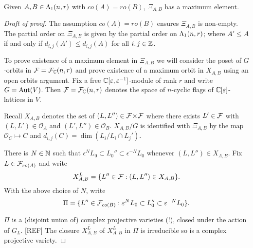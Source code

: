 \documentclass[a4paper, 11pt]{report}
\begin{document}
\begin{proposition}\label{proposition:existence-maximum}
Given $A,B\in\Lambda_1(n,r)$ with $co(A)=ro(B)$, $\Xi_{A,B}$ has a maximum element.
\end{proposition}

\begin{proof}[Draft of proof]
The assumption $co(A)=ro(B)$ ensures $\Xi_{A,B}$ is non-empty. The partial order on $\Xi_{A,B}$ is given by the partial order on $\Lambda_1(n,r)$; where $A'\le A$ if and only if $d_{i,j}(A')\le d_{i,j}(A)$ for all $i,j\in\mathbb{Z}$.

To prove existence of a maximum element in $\Xi_{A,B}$ we will consider the poset of $G$-orbits in $\mathcal{F}=\mathcal{F}_{\mathbb{C}}(n,r)$ and prove existence of a maximum orbit in $X_{A,B}$ using an open orbits argument. Fix a free $\mathbb{C}[\varepsilon,\varepsilon^{-1}]$-module of rank $r$ and write $G=\operatorname{Aut}(V)$. Then $\mathcal{F} = \mathcal{F}_{\mathbb{C}}(n,r)$ denotes the space of $n$-cyclic flags of $\mathbb{C}[\varepsilon]$-lattices in $V$.

Recall $X_{A,B}$ denotes the set of $(L,L'')\in{\mathcal{F}\!\times\!\mathcal{F}}$ where there exists $L'\in\mathcal{F}$ with $(L,L')\in\mathcal{O}_A$ and $(L',L'')\in\mathcal{O}_B$. $X_{A,B}/G$ is identified with $\Xi_{A,B}$ by the map $\mathcal{O}_C\mapsto C$ and $d_{i,j}(C) = \dim(L_i/{L_i\cap L_j'})$.

There is $N\in\mathbb{N}$ such that $\epsilon^N L_0\subset L_0''\subset \epsilon^{-N}L_0$ whenever $(L,L'')\in X_{A,B}$. Fix $L\in\mathcal{F}_{ro(A)}$ and write
\begin{equation*}
X_{A,B}^L = \{L''\in\mathcal{F}: (L,L'')\in X_{A,B}\}.
\end{equation*}
With the above choice of $N$, write
\begin{equation*}
\Pi = \{L''\in\mathcal{F}_{co(B)}: \varepsilon^N L_0\subset L_0''\subset \varepsilon^{-N} L_0\}.
\end{equation*}

$\Pi$ is a (disjoint union of) complex projective varieties (!), closed under the action of $G_L$. [REF] The closure $\overline{X_{A,B}^L}$ of $X_{A,B}^L$ in $\Pi$ is irreducible so is a complex projective variety.


\end{proof}
\end{document}
